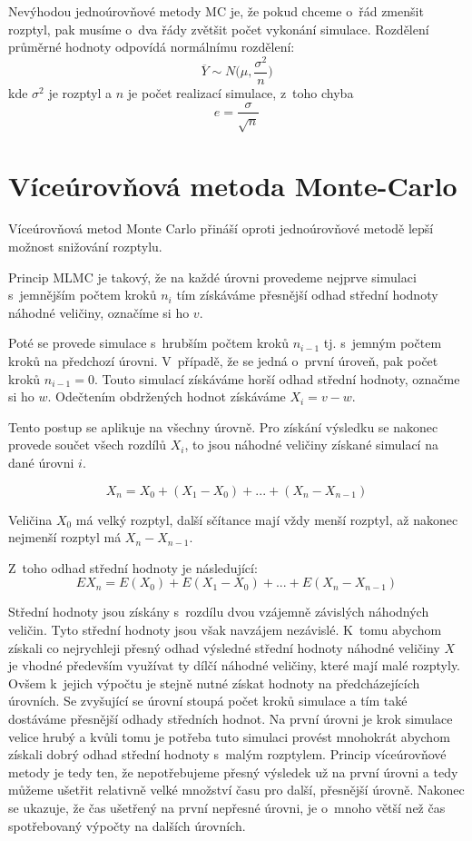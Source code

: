 \documentclass[FM, RP]{tulthesis}
\begin{document}
Nevýhodou jednoúrovňové metody MC je, že pokud chceme o~řád zmenšit rozptyl, pak musíme o~dva řády zvětšit počet vykonání simulace. Rozdělení průměrné hodnoty odpovídá normálnímu rozdělení: $$\overline{Y} \sim  N \bigg( \mu , \frac{\sigma^{2}}{n} \bigg)$$
\noindent kde $\sigma^{2}$ je rozptyl a $n$ je počet realizací simulace, z~toho chyba 
$$ e = \frac{\sigma}{\sqrt{n}} $$


\section{Víceúrovňová metoda Monte-Carlo}
Víceúrovňová metod Monte Carlo přináší oproti jednoúrovňové metodě lepší možnost snižování rozptylu. 

Princip MLMC je takový, že na každé úrovni provedeme nejprve simulaci s~jemnějším počtem kroků $n_{i}$ tím získáváme přesnější odhad střední hodnoty náhodné veličiny, označíme si ho $v$.

Poté se provede simulace s~hrubším počtem kroků $n_{i-1}$ tj. s~jemným počtem kroků na předchozí úrovni. V~případě, že se jedná o~první úroveň, pak počet kroků $n_{i-1} = 0$. Touto simulací získáváme horší odhad střední hodnoty, označme si ho $w$. Odečtením obdržených hodnot získáváme  $X_{i} = v - w$.  

Tento postup se aplikuje na všechny úrovně. Pro získání výsledku se nakonec provede součet všech rozdílů $X_{i}$, to jsou náhodné veličiny získané simulací na dané úrovni $i$.

$$ {X}_{n} = {X}_{0} + ({X}_{1} - {X}_{0}) + ... + ({X}_{n} - {X}_{n-1})$$

Veličina ${X}_{0}$ má velký rozptyl, další sčítance mají vždy menší rozptyl, až nakonec nejmenší rozptyl má ${X}_{n} - {X}_{n-1}$.

Z~toho odhad střední hodnoty je následující:
$$ {EX}_{n} = E({X}_{0}) + E({X}_{1} - {X}_{0}) + ... + E({X}_{n} - {X}_{n-1})$$

Střední hodnoty jsou získány s~rozdílu dvou vzájemně závislých náhodných veličin. 
Tyto střední hodnoty jsou však navzájem nezávislé. K~tomu abychom získali co nejrychleji přesný odhad výsledné střední hodnoty náhodné veličiny $X$ je vhodné především využívat ty dílčí náhodné veličiny, které mají malé rozptyly. Ovšem k~jejich výpočtu je stejně nutné získat hodnoty na předcházejících úrovních. Se zvyšující se úrovní stoupá počet kroků simulace a tím také dostáváme přesnější odhady středních hodnot. Na první úrovni je krok simulace velice hrubý a kvůli tomu je potřeba tuto simulaci provést mnohokrát abychom získali dobrý odhad střední hodnoty s~malým rozptylem. 
Princip víceúrovňové metody je tedy ten, že nepotřebujeme přesný výsledek už na první úrovni a tedy můžeme ušetřit relativně velké množství času pro další, přesnější úrovně. Nakonec se ukazuje, že čas ušetřený na první nepřesné úrovni, je o~mnoho větší než čas spotřebovaný výpočty na dalších úrovních. 
\newline
\end{document}
